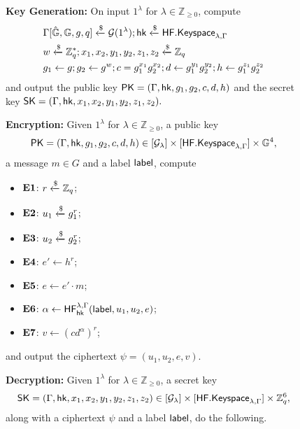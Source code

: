 	\begin{figure}[tbp]
	\begin{framed}\small
		\textbf{Key Generation:} On input $1^\lambda$ for $\lambda\in\mathbb{Z}_{\geq 0}$, compute
		\begin{align*}
			&\Gamma[\hat{\mathbb{G}}, \mathbb{G}, g, q]\xleftarrow{\$}\mathcal{G}(1^\lambda); \mathsf{hk}\xleftarrow{\$}\mathsf{HF.Keyspace}_{\lambda,\Gamma}\\
			&w\xleftarrow{\$}\mathbb{Z}_q^{*}; x_1,x_2,y_1,y_2,z_1,z_2\xleftarrow{\$}\mathbb{Z}_q\\
			&g_1\gets g; g_2\gets g^{w}; c = g_1^{x_1}g_2^{x_2}; d\gets g_1^{y_1}g_2^{y_2}; h\gets g_1^{z_1}g_2^{z_2}
		\end{align*}
		and output the public key $\mathsf{PK} = (\Gamma,\mathsf{hk},g_1,g_2,c,d,h)$ and the secret key $\mathsf{SK} = (\Gamma, \mathsf{hk}, x_1,x_2,y_1,y_2,z_1,z_2).$
		
		\vspace{4mm}
		
		\textbf{Encryption:} Given $1^\lambda$ for $\lambda\in\mathbb{Z}_{\geq 0}$, a public key $$\mathsf{PK}=(\Gamma,\mathsf{hk},g_1,g_2,c,d,h)\in[\mathcal{G}_\lambda]\times[\mathsf{HF.Keyspace}_{\lambda,\Gamma}]\times\mathbb{G}^4,$$ a message $m\in G$ and a label $\mathsf{label}$, compute
		
		\begin{itemize}
			\itemsep=0em
			\item[]\textbf{$\mathbf{E1}$}: $r\xleftarrow{\$}\mathbb{Z}_q$;
			\item[]\textbf{$\mathbf{E2}$}: $u_1\xleftarrow{\$} g_1^r$;
			\item[]\textbf{$\mathbf{E3}$}: $u_2\xleftarrow{\$} g_2^r$;
			\item[]\textbf{$\mathbf{E4}$}: $e'\gets h^r$;
			\item[]\textbf{$\mathbf{E5}$}: $e\gets e'\cdot m$;
			\item[]\textbf{$\mathbf{E6}$}: $\alpha\gets\mathsf{HF}^{\lambda,\Gamma}_{\mathsf{hk}}(\mathsf{label}, u_1, u_2, e)$;
			\item[]\textbf{$\mathbf{E7}$}: $v\gets (cd^\alpha)^r$;
		\end{itemize}
		and output the ciphertext $\psi = (u_1, u_2, e, v)$.
		
		\vspace{4mm}
		
		\textbf{Decryption:} Given $1^\lambda$ for $\lambda\in\mathbb{Z}_{\geq 0}$, a secret key $$\mathsf{SK}=(\Gamma, \mathsf{hk}, x_1,x_2,y_1,y_2,z_1,z_2)\in[\mathcal{G}_\lambda]\times[\mathsf{HF.Keyspace}_{\lambda,\Gamma}]\times\mathbb{Z}_q^{6},$$
		along with a ciphertext $\psi$ and a label $\mathsf{label}$, do the following.
		

\end{framed}
\end{figure}
